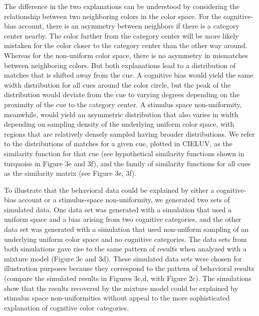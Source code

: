 The difference in the two explanations can be understood by considering the relationship between two neighboring colors in the color space. For the cognitive-bias account, there is an asymmetry between neighbors if there is a category center nearby. The color further from the category center will be more likely mistaken for the color closer to the category center than the other way around. Whereas for the non-uniform color space, there is no asymmetry in mismatches between neighboring colors. But both explanations lead to a distribution of matches that is shifted away from the cue. A cognitive bias would yield the same width distribution for all cues around the color circle, but the peak of the distribution would deviate from the cue to varying degrees depending on the proximity of the cue to the category center. A stimulus space non-uniformity, meanwhile, would yield an asymmetric distribution that also varies in width depending on sampling density of the underlying uniform color space, with regions that are relatively densely sampled having broader distributions. We refer to the distributions of matches for a given cue, plotted in CIELUV, as the similarity function for that cue (see hypothetical similarity functions shown in turquoise in Figure 3e and 3f), and the family of similarity functions for all cues as the similarity matrix (see Figure 3e, 3f). 

To illustrate that the behavioral data could be explained by either a cognitive-bias account or a stimulus-space non-uniformity, we generated two sets of simulated data. One data set was generated with a simulation that used a uniform space and a bias arising from two cognitive categories, and the other data set was generated with a simulation that used non-uniform sampling of an underlying uniform color space and no cognitive categories. The data sets from both simulations gave rise to the same pattern of results when analyzed with a mixture model \citep{zhang_discrete_2008, bae_why_2015} (Figure 3c and 3d). These simulated data sets were chosen for illustration purposes because they correspond to the pattern of behavioral results (compare the simulated results in Figures 3c,d, with Figure 2c). The simulations show that the results recovered by the mixture model could be explained by stimulus space non-uniformities without appeal to the more sophisticated explanation of cognitive color categories. 

